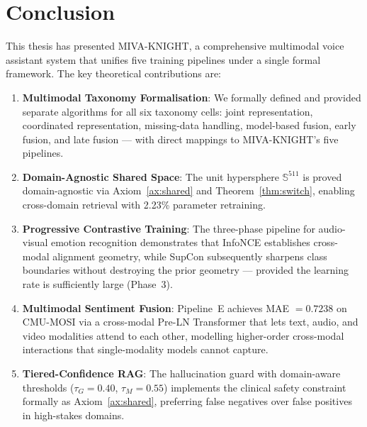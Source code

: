 \documentclass[12pt,a4paper]{article}
\theoremstyle{definition}
\theoremstyle{plain}
\theoremstyle{remark}
\newcommand{\Sph}{\mathbb{S}}
\begin{document}
\newpage
\section{Conclusion}
\label{sec:conclusion}

This thesis has presented MIVA-KNIGHT, a comprehensive multimodal voice assistant system that unifies five training pipelines under a single formal framework. The key theoretical contributions are:

\begin{enumerate}
  \item \textbf{Multimodal Taxonomy Formalisation}: We formally defined and provided separate algorithms for all six taxonomy cells: joint representation, coordinated representation, missing-data handling, model-based fusion, early fusion, and late fusion — with direct mappings to MIVA-KNIGHT's five pipelines.

  \item \textbf{Domain-Agnostic Shared Space}: The unit hypersphere $\Sph^{511}$ is proved domain-agnostic via Axiom~\ref{ax:shared} and Theorem~\ref{thm:switch}, enabling cross-domain retrieval with 2.23\% parameter retraining.

  \item \textbf{Progressive Contrastive Training}: The three-phase pipeline for audio-visual emotion recognition demonstrates that InfoNCE establishes cross-modal alignment geometry, while SupCon subsequently sharpens class boundaries without destroying the prior geometry — provided the learning rate is sufficiently large (Phase~3).

  \item \textbf{Multimodal Sentiment Fusion}: Pipeline~E achieves MAE $= 0.7238$ on CMU-MOSI via a cross-modal Pre-LN Transformer that lets text, audio, and video modalities attend to each other, modelling higher-order cross-modal interactions that single-modality models cannot capture.

  \item \textbf{Tiered-Confidence RAG}: The hallucination guard with domain-aware thresholds ($\tau_G = 0.40$, $\tau_M = 0.55$) implements the clinical safety constraint formally as Axiom~\ref{ax:shared}, preferring false negatives over false positives in high-stakes domains.
\end{enumerate}
\end{document}
